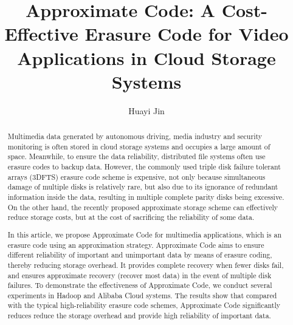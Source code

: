 \documentclass[sigconf]{acmart}
\begin{document}
\title{Approximate Code: A Cost-Effective Erasure Code for Video Applications in Cloud Storage Systems}

\author{Huayi Jin}



\begin{abstract}
Multimedia data generated by autonomous driving, media industry and security monitoring is often stored in cloud storage systems and occupies a large amount of space. Meanwhile, to ensure the data reliability, distributed file systems often use erasure codes to backup data. However, the commonly used triple disk failure tolerant arrays (3DFTS) erasure code scheme is expensive, not only because simultaneous damage of multiple disks is relatively rare, but also due to its ignorance of redundant information inside the data, resulting in multiple complete parity disks being excessive. On the other hand, the recently proposed approximate storage scheme can effectively reduce storage costs, but at the cost of sacrificing the reliability of some data.

In this article, we propose Approximate Code for multimedia applications, which is an erasure code using an approximation strategy. Approximate Code aims to ensure different reliability of important and unimportant data by means of erasure coding, thereby reducing storage overhead. It provides complete recovery when fewer disks fail, and ensures approximate recovery (recover most data) in the event of multiple disk failures. To demonstrate the effectiveness of Approximate Code, we conduct several experiments in Hadoop and Alibaba Cloud systems. 
The results show that compared with the typical high-reliability erasure code schemes, Approximate Code significantly reduces reduce the storage overhead and provide high reliability of important data.

\end{abstract}

%
%
\end{document}
